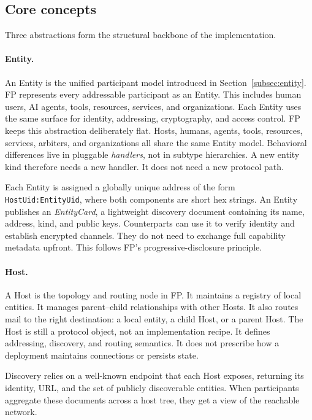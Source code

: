 \documentclass{llmxive}
\begin{document}
\subsection{Core concepts}
\label{app:concepts}

Three abstractions form the structural backbone of the implementation.

\paragraph{Entity.}
An Entity is the unified participant model introduced in Section~\ref{subsec:entity}. FP represents every addressable participant as an Entity. This includes human users, AI agents, tools, resources, services, and organizations. Each Entity uses the same surface for identity, addressing, cryptography, and access control.
FP keeps this abstraction deliberately flat. Hosts, humans, agents, tools, resources, services, arbiters, and organizations all share the same Entity model. Behavioral differences live in pluggable \emph{handlers}, not in subtype hierarchies. A new entity kind therefore needs a new handler. It does not need a new protocol path.

Each Entity is assigned a globally unique address of the form
\texttt{HostUid:EntityUid}, where both components are short hex strings.
An Entity publishes an \emph{EntityCard}, a lightweight discovery
document containing its name, address, kind, and public keys. Counterparts can use it to verify identity and establish encrypted channels. They do not need to exchange full capability metadata upfront. This follows FP's progressive-disclosure principle.

\paragraph{Host.}
A Host is the topology and routing node in FP. It maintains a registry of local entities. It manages parent--child relationships with other Hosts. It also routes mail to the right destination: a local entity, a child Host, or a parent Host.
The Host is still a protocol object, not an implementation recipe. It defines addressing, discovery, and routing semantics. It does not prescribe how a deployment maintains connections or persists state.

Discovery relies on a well-known endpoint that each Host exposes,
returning its identity, URL, and the set of publicly discoverable
entities. When participants aggregate these documents across a host tree, they get a view of the reachable network.
\end{document}
